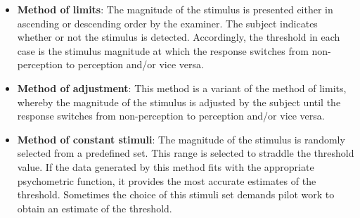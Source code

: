 \begin{itemize}

	\item \textbf{Method of limits}: The magnitude of the stimulus is presented either in ascending or descending order by the examiner. The subject indicates whether or not the stimulus is detected. Accordingly, the threshold in each case is the stimulus magnitude at which the response switches from non-perception to perception and/or vice versa. \cite{Kingdom2016}
	\item \textbf{Method of adjustment}: This method is a variant of the method of limits, whereby the magnitude of the stimulus is adjusted by the subject until the response switches from non-perception to perception and/or vice versa. \cite{Kingdom2016} %
	\item \textbf{Method of constant stimuli}: The magnitude of the stimulus is randomly selected from a predefined set. This range is selected to straddle the threshold value. If the data generated by this method fits with the appropriate psychometric function, it provides the most accurate estimates of the threshold. Sometimes the  choice of this stimuli set demands pilot work to obtain an estimate of the threshold. \cite{Kingdom2016}
\end{itemize}
